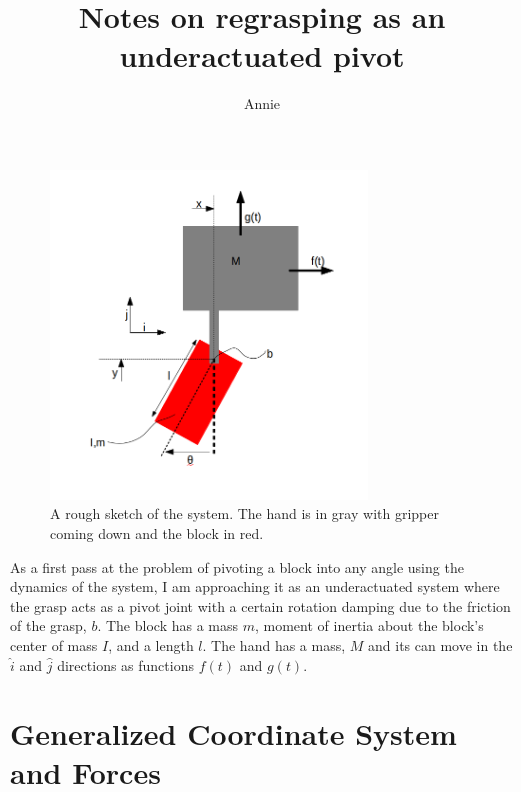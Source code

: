 \documentclass{article}
\begin{document}
\title{Notes on regrasping as an underactuated pivot}
\author{Annie}
\maketitle


\providecommand{\abs}[1]{\left\vert#1\right\vert}
\providecommand{\norm}[1]{\left\Vert#1\right\Vert}

\begin{figure}[h!]
  \centering
  \includegraphics[width=0.75\textwidth]{diagram.png}
  \caption{A rough sketch of the system. The hand is in gray with gripper coming down and the block in red.}
\end{figure}

As a first pass at the problem of pivoting a block into any angle using the dynamics of the system, I am approaching it as an underactuated system where the grasp acts as a pivot joint with a certain rotation damping due to the friction of the grasp, $b$. The block has a mass $m$, moment of inertia about the block's center of mass $I$, and a length $l$. The hand has a mass, $M$ and its can move in the $\hat{i}$ and $\hat{j}$ directions as functions  $f(t)$ and $g(t)$. 

\section{Generalized Coordinate System and Forces}
\end{document}
